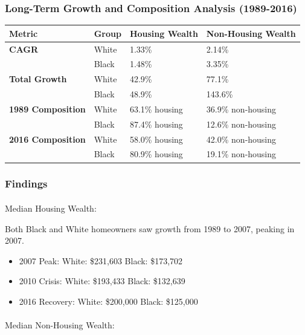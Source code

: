 \documentclass[
  12pt]{article}
\makeatletter
\let\oldparagraph\paragraph
\renewcommand{\paragraph}{
    \@ifstar
      \xxxParagraphStar
      \xxxParagraphNoStar
  }
\newcommand{\xxxParagraphStar}[1]{\oldparagraph*{#1}\mbox{}}
\newcommand{\xxxParagraphNoStar}[1]{\oldparagraph{#1}\mbox{}}
\providecommand{\tightlist}{%
  \setlength{\itemsep}{0pt}\setlength{\parskip}{0pt}}\usepackage{longtable,booktabs,array}
\makeatother
\begin{document}
\subsubsection{Long-Term Growth and Composition Analysis
(1989-2016)}\label{long-term-growth-and-composition-analysis-1989-2016}

\begin{longtable}[]{@{}llll@{}}
\toprule\noalign{}
Metric & Group & Housing Wealth & Non-Housing Wealth \\
\midrule\noalign{}
\endhead
\bottomrule\noalign{}
\endlastfoot
\textbf{CAGR} & White & 1.33\% & 2.14\% \\
& Black & 1.48\% & 3.35\% \\
\textbf{Total Growth} & White & 42.9\% & 77.1\% \\
& Black & 48.9\% & 143.6\% \\
\textbf{1989 Composition} & White & 63.1\% housing & 36.9\%
non-housing \\
& Black & 87.4\% housing & 12.6\% non-housing \\
\textbf{2016 Composition} & White & 58.0\% housing & 42.0\%
non-housing \\
& Black & 80.9\% housing & 19.1\% non-housing \\
\end{longtable}

\subsubsection{Findings}\label{findings-1}

\paragraph{Median Housing Wealth:}\label{median-housing-wealth}

Both Black and White homeowners saw growth from 1989 to 2007, peaking in
2007.

\begin{itemize}
\tightlist
\item
  2007 Peak: White: \$231,603 \textbar{} Black: \$173,702
\item
  2010 Crisis: White: \$193,433 \textbar{} Black: \$132,639
\item
  2016 Recovery: White: \$200,000 \textbar{} Black: \$125,000
\end{itemize}

\paragraph{Median Non-Housing Wealth:}\label{median-non-housing-wealth}
\end{document}
